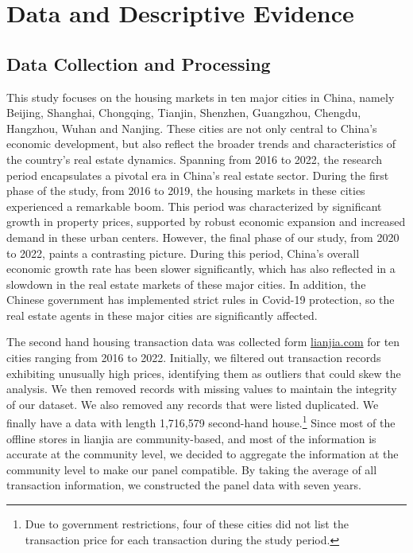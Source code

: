 \documentclass[12pt]{article}
\begin{document}
\section{Data and Descriptive Evidence \label{sec:data}}

\subsection{Data Collection and Processing} \label{subsec:data_collection}

This study focuses on the housing markets in ten major cities in China, namely Beijing, Shanghai, Chongqing, Tianjin, Shenzhen, Guangzhou, Chengdu, Hangzhou, Wuhan and Nanjing. These cities are not only central to China's economic development, but also reflect the broader trends and characteristics of the country's real estate dynamics. Spanning from 2016 to 2022, the research period encapsulates a pivotal era in China's real estate sector. During the first phase of the study, from 2016 to 2019, the housing markets in these cities experienced a remarkable boom. This period was characterized by significant growth in property prices, supported by robust economic expansion and increased demand in these urban centers. However, the final phase of our study, from 2020 to 2022, paints a contrasting picture. During this period, China's overall economic growth rate has been slower significantly, which has also reflected in a slowdown in the real estate markets of these major cities. In addition, the Chinese government has implemented strict rules in Covid-19 protection, so the real estate agents in these major cities are significantly affected.

The second hand housing transaction data was collected form \href{https://bj.lianjia.com/}{lianjia.com} for ten cities ranging from 2016 to 2022. Initially, we filtered out transaction records exhibiting unusually high prices, identifying them as outliers that could skew the analysis. We then removed records with missing values to maintain the integrity of our dataset. We also removed any records that were listed duplicated. We finally have a data with length 1,716,579 second-hand house.\footnote{Due to government restrictions, four of these cities did not list the transaction price for each transaction during the study period.} Since most of the offline stores in lianjia are community-based, and most of the information is accurate at the community level, we decided to aggregate the information at the community level to make our panel compatible. By taking the average of all transaction information, we constructed the panel data with seven years.
\end{document}
